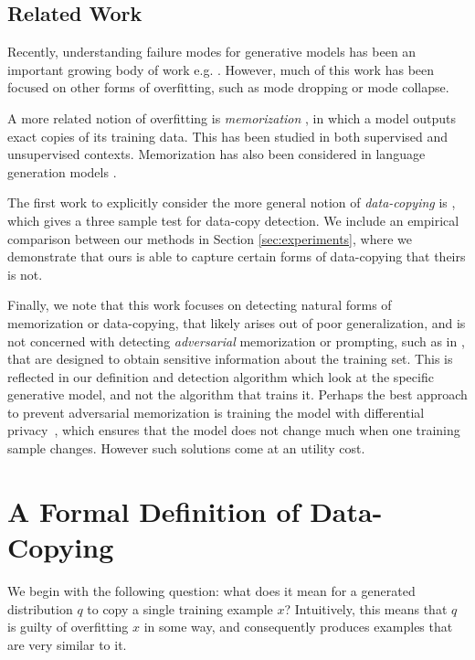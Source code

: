 \subsection{Related Work}

Recently, understanding failure modes for generative models has been an important growing body of work e.g. \citep{SGZCRC16, RW18, SBLBG18}. However, much of this work has been focused on other forms of overfitting, such as mode dropping or mode collapse.

A more related notion of overfitting is \textit{memorization} \citep{lopez2016revisiting,XHYGSWK18, C18}, in which a model outputs exact copies of its training data. This has been studied in both supervised \citep{BBFST21, Feldman20} and unsupervised \citep{BGWC21, CHCW21} contexts. Memorization has also been considered in language generation models \cite{Carlini22}. 

The first work to explicitly consider the more general notion of \textit{data-copying} is \citep{MCD2020}, which gives a three sample test for data-copy detection. We include an empirical comparison between our methods in Section \ref{sec:experiments}, where we demonstrate that ours is able to capture certain forms of data-copying that theirs is not. 

Finally, we note that this work focuses on detecting natural forms of memorization or data-copying, that likely arises out of poor generalization, and is not concerned with detecting \textit{adversarial} memorization or prompting, such as in \cite{Carlini19}, that are designed to obtain sensitive information about the training set. This is reflected in our definition and detection algorithm which look at the specific generative model, and not the algorithm that trains it.  Perhaps the best approach to prevent adversarial  memorization is training the model with differential privacy~\cite{Dwork06}, which ensures that the model does not change much when one training sample changes. However such solutions come at an utility cost. 

\section{A Formal Definition of Data-Copying}

We begin with the following question: what does it mean for a generated distribution $q$ to copy a single training example $x$? Intuitively, this means that $q$ is guilty of overfitting $x$ in some way, and consequently produces examples that are very similar to it. 

